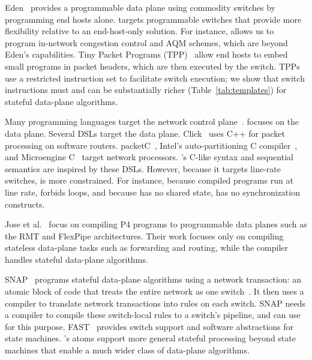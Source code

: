 Eden~\cite{eden} provides a programmable data plane using commodity switches by
programming end hosts alone. \pktlanguage targets programmable switches that
provide more flexibility relative to an end-host-only solution. For instance,
\pktlanguage allows us to program in-network congestion control and AQM
schemes, which are beyond Eden's capabilities.  Tiny Packet Programs
(TPP)~\cite{tpp} allow end hosts to embed small programs in packet headers,
which are then executed by the switch. TPPs use a restricted instruction set to
facilitate switch execution; we show that switch instructions must and can be
substantially richer (Table~\ref{tab:templates}) for stateful data-plane
algorithms.

 Many programming languages target
the network control plane~\cite{frenetic, maple}. \pktlanguage focuses on the
data plane. Several DSLs target the data plane. Click~\cite{click} uses C++ for
packet processing on software routers. packetC~\cite{packetc}, Intel's
auto-partitioning C compiler~\cite{intel_uiuc_pldi}, and Microengine
C~\cite{microenginec} target network processors. \pktlanguage's C-like syntax
and sequential semantics are inspired by these DSLs. However, because it
targets line-rate switches, \pktlanguage is more constrained. For instance,
because compiled programs run at line rate, \pktlanguage forbids loops, and
because \absmachine has no shared state, \pktlanguage has no synchronization
constructs.

Jose et al.~\cite{lavanya_compiler} focus on compiling P4 programs to
programmable data planes such as the RMT and FlexPipe architectures. Their work
focuses only on compiling stateless data-plane tasks such as forwarding and
routing, while the \pktlanguage compiler handles stateful data-plane
algorithms.

SNAP~\cite{snap} programs stateful data-plane algorithms using a network
transaction: an atomic block of code that treats the entire network as one
switch~\cite{onebigswitch}. It then uses a compiler to translate network
transactions into rules on each switch. SNAP needs a compiler to compile these
switch-local rules to a switch's pipeline, and can use \pktlanguage for this
purpose. FAST~\cite{fast} provides switch support and software abstractions for
state machines. \absmachine's atoms support more general stateful processing
beyond state machines that enable a much wider class of data-plane algorithms.

